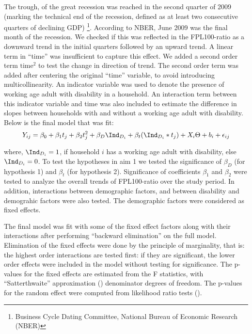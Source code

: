 \documentclass[11pt]{extarticle} %
\begin{document}
The  trough, of the great recession was reached in the second quarter of 2009 (marking the technical end of the recession, defined as at least two consecutive quarters of declining GDP) \footnote{Business Cycle Dating Committee, National Bureau of Economic Research (NBER)}. According to NBER, June 2009 was the final month of the recession. We checked if this was reflected in the FPL100-ratio as a downward trend in the initial quarters followed by an upward trend. A linear term in ``time'' was insufficient to capture this effect. We added a second order term $\text{time}^2$ to test the change in direction of trend. The second order term was added after centering the original ``time'' variable, to avoid introducing multicollinearity. An indicator variable was used to denote the presence of working age adult with disability in a household. An interaction term between this indicator variable and time was also included to estimate the difference in slopes between households with and without a working age adult with disability. Below is the final model that was fit: 
\vspace{-0.5cm}
\begin{equation}
Y_{ij} = \beta_0 + \beta_1 t_j + \beta_2 t_j^2 + \beta_D \Ind_{D_i} + \beta_t(\Ind_{D_i}*t_j) + X_i\Theta + b_i + \epsilon_{ij}
\label{eq:MixedEffects2}
\end{equation}

where, $\Ind_{D_i} = 1$, if household $i$ has a working age adult with disability, else $\Ind_{D_i} = 0$. To test the hypotheses in aim 1 we tested the significance of $\beta_D$ (for hypothesis 1) and $\beta_t$ (for hypothesis 2). Significance of coefficients $\beta_1$ and $\beta_2$ were tested to analyze the overall trends of FPL100-ratio over the study period. In addition, interactions between demographic factors, and between disability and demograhic factors were also tested. The demographic factors were considered as fixed effects.

The final model was fit with some of the fixed effect factors along with their interactions after performing ``backward elimination'' on the full model. Elimination of the fixed effects were done by the principle of marginality, that is: the highest order interactions are tested first: if they are significant, the lower order effects were included in the model without testing for significance. The p-values for the fixed effects are estimated from the F statistics, with ``Satterthwaite'' approximation (\cite{Satterthwaite_1946_Biometrics}) denominator degrees of freedom. The p-values for the random effect were computed from likelihood ratio tests (\cite{Morrell_1998_Biometrics}). 
\end{document}

